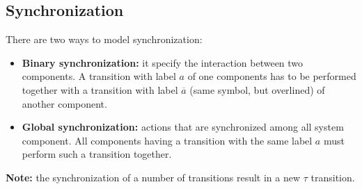 \subsection{Synchronization}
There are two ways to model synchronization:
\begin{itemize}
    \item \textbf{Binary synchronization:} it specify the interaction between two components. A transition with label $a$ of one components has to be performed together with a transition with label $\overline{a}$ (same symbol, but overlined) of another component.

    \item \textbf{Global synchronization:} actions that are synchronized among all system component. All components having a transition with the same label $a$ must perform such a transition together.
\end{itemize}

\textbf{Note:} the synchronization of a number of transitions result in a new $\tau$ transition.